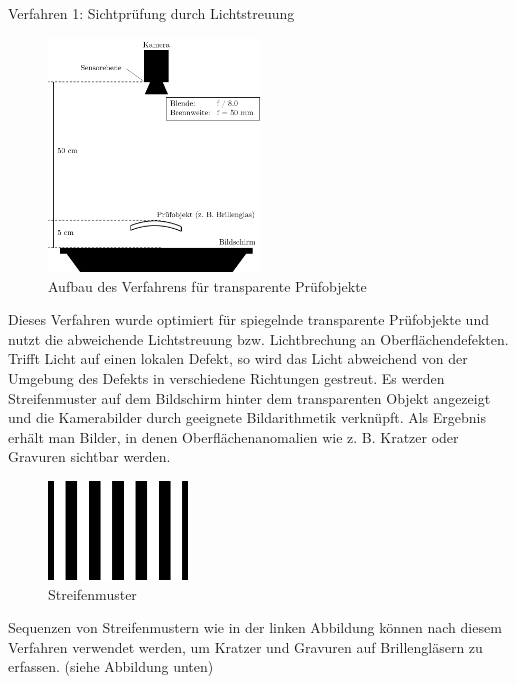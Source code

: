 \documentclass[
  scale = 1.5,
]{hftpostr}
\begin{document}
\begin{frame}[t]
	\begin{columns}[onlytextwidth, T]
		\begin{column}{.48\textwidth}
			\begin{block}{Verfahren 1: Sichtprüfung durch Lichtstreuung}
				\begin{figure}
						\includegraphics[width=0.5\textwidth]{aufbau}
						\caption{Aufbau des Verfahrens für transparente Prüfobjekte}
				\end{figure}

				Dieses Verfahren wurde optimiert für spiegelnde transparente Prüfobjekte und nutzt die abweichende Lichtstreuung bzw. Lichtbrechung an Oberflächendefekten.
				Trifft Licht auf einen lokalen Defekt, so wird das Licht abweichend von der Umgebung des Defekts in verschiedene Richtungen gestreut.
				Es werden Streifenmuster auf dem Bildschirm hinter dem transparenten Objekt angezeigt und die Kamerabilder durch geeignete Bildarithmetik verknüpft.
				Als Ergebnis erhält man Bilder, in denen Oberflächenanomalien wie z. B. Kratzer oder Gravuren sichtbar werden.
				
				\begin{figure}
					\vspace{-0.5\baselineskip}
					\includegraphics[frame,width=0.33\textwidth]{rechteckMuster}
					\caption{Streifenmuster}
				\end{figure}
				
				\par\bigskip
				Sequenzen von Streifenmustern wie in der linken Abbildung können nach diesem Verfahren verwendet werden, um Kratzer und Gravuren auf Brillengläsern zu erfassen. (siehe Abbildung unten)
				

\end{block}
\end{column}
\end{columns}
\end{frame}
\end{document}
